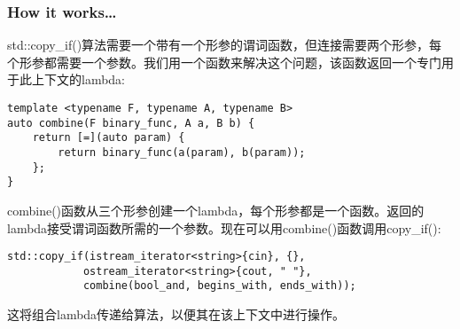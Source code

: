\subsubsection{How it works…}

std::copy\_if()算法需要一个带有一个形参的谓词函数，但连接需要两个形参，每个形参都需要一个参数。我们用一个函数来解决这个问题，该函数返回一个专门用于此上下文的lambda:

\begin{lstlisting}[style=styleCXX]
template <typename F, typename A, typename B>
auto combine(F binary_func, A a, B b) {
	return [=](auto param) {
		return binary_func(a(param), b(param));
	};
}
\end{lstlisting}

combine()函数从三个形参创建一个lambda，每个形参都是一个函数。返回的lambda接受谓词函数所需的一个参数。现在可以用combine()函数调用copy\_if():

\begin{lstlisting}[style=styleCXX]
std::copy_if(istream_iterator<string>{cin}, {},
			ostream_iterator<string>{cout, " "},
			combine(bool_and, begins_with, ends_with));
\end{lstlisting}

这将组合lambda传递给算法，以便其在该上下文中进行操作。









